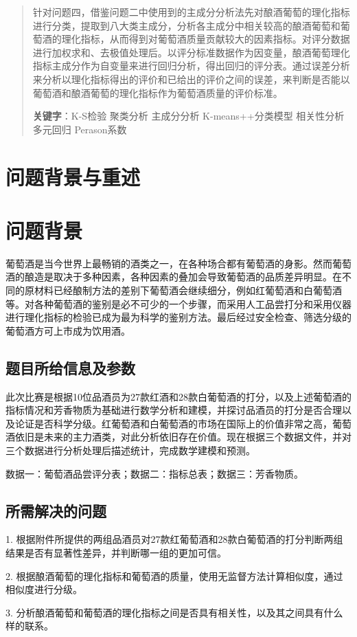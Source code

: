 \documentclass[UTF8]{ctexart}
\begin{document}
\begin{abstract}
	针对问题四，借鉴问题二中使用到的主成分分析法先对酿酒葡萄的理化指标进行分类，提取到八大类主成分，分析各主成分中相关较高的酿酒葡萄和葡萄酒的理化指标，从而得到对葡萄酒质量贡献较大的因素指标。对评分数据进行加权求和、去极值处理后。以评分标准数据作为因变量，酿酒葡萄理化指标主成分作为自变量来进行回归分析，得出回归的评分表。通过误差分析来分析以理化指标得出的评价和已给出的评价之间的误差，来判断是否能以葡萄酒和酿酒葡萄的理化指标作为葡萄酒质量的评价标准。

	\textbf{关键字}：K-S检验  聚类分析  主成分分析 K-means++分类模型 相关性分析 多元回归	Perason系数

\end{abstract}


\section{问题背景与重述}
\section{问题背景}
葡萄酒是当今世界上最畅销的酒类之一，在各种场合都有葡萄酒的身影。然而葡萄酒的酿造是取决于多种因素，各种因素的叠加会导致葡萄酒的品质差异明显。在不同的原材料已经酿制方法的差别下葡萄酒会继续细分，例如红葡萄酒和白葡萄酒等。对各种葡萄酒的鉴别是必不可少的一个步骤，而采用人工品尝打分和采用仪器进行理化指标的检验已成为最为科学的鉴别方法。最后经过安全检查、筛选分级的葡萄酒方可上市成为饮用酒。
\subsection{题目所给信息及参数}
此次比赛是根据10位品酒员为27款红酒和28款白葡萄酒的打分，以及上述葡萄酒的指标情况和芳香物质为基础进行数学分析和建模，并探讨品酒员的打分是否合理以及论证是否科学分级。红葡萄酒和白葡萄酒的市场在国际上的价值非常之高，葡萄酒依旧是未来的主力酒类，对此分析依旧存在价值。现在根据三个数据文件，并对三个数据进行分析处理后描述统计，完成数学建模和预测。

数据一：葡萄酒品尝评分表；数据二：指标总表；数据三：芳香物质。
\subsection{所需解决的问题}
1. 根据附件所提供的两组品酒员对27款红葡萄酒和28款白葡萄酒的打分判断两组结果是否有显著性差异，并判断哪一组的更加可信。

2. 根据酿酒葡萄的理化指标和葡萄酒的质量，使用无监督方法计算相似度，通过相似度进行分级。

3. 分析酿酒葡萄和葡萄酒的理化指标之间是否具有相关性，以及其之间具有什么样的联系。
\end{document}
